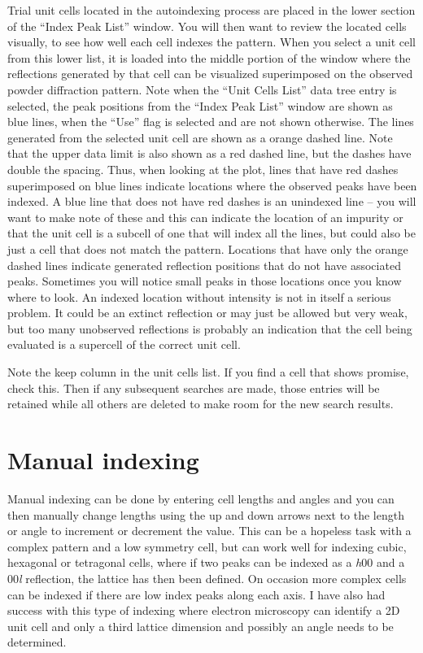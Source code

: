 Trial unit cells located in the autoindexing process are placed in the lower section of the ``Index Peak List'' window. You will then want to review the located cells visually, to see how well each cell indexes the pattern. When you select a unit cell from this lower list, it is loaded into the middle portion of the window where the reflections generated by that cell can be visualized superimposed on the observed powder diffraction pattern. Note when the  ``Unit Cells List'' data tree entry is selected, the peak positions from the ``Index Peak List'' window are shown as blue lines, when the ``Use'' flag is selected and are not shown otherwise. The lines generated from the selected unit cell are shown as a orange dashed line. Note that the upper data limit is also shown as a red dashed line, but the dashes have double the spacing. Thus, when looking at the plot, lines that have red dashes superimposed on blue lines indicate locations where the observed peaks have been indexed. A blue line that does not have red dashes is an unindexed line -- you will want to make note of these and this can indicate the location of an impurity or that the unit cell is a subcell of one that will index all the lines, but could also be just a cell that does not match the pattern. Locations that have only the orange dashed lines indicate generated reflection positions that do not have associated peaks. Sometimes you will notice small peaks in those locations once you know where to look. An indexed location without intensity is not in itself a serious problem. It could be an extinct reflection or may just be allowed but very weak, but too many unobserved reflections is probably an indication that the cell being evaluated is a supercell of the correct unit cell. 

Note the keep column in the unit cells list. If you find a cell that shows promise, check this. Then if any subsequent searches are made, those entries will be retained while all others are deleted to make room for the new search results. 

\section{Manual indexing}
Manual indexing can be done by entering cell lengths and angles and you can then manually change lengths using the up and down arrows next to the length or angle to increment or decrement the value. This can be a hopeless task with a complex pattern and a low symmetry cell, but can work well for indexing cubic, hexagonal or tetragonal cells, where if two peaks can be indexed as a \textit{h}00 and a 00\textit{l} reflection, the lattice has then been defined. On occasion more complex cells can be indexed if there are low index peaks along each axis. I have also had success with this type of indexing where electron microscopy can identify a 2D unit cell and only a third lattice dimension and possibly an angle needs to be determined. 

